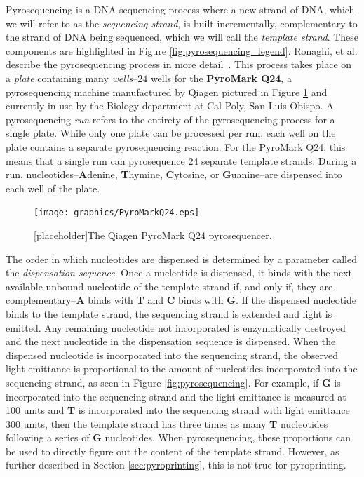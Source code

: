 \documentclass[12pt]{ucthesis}
\begin{document}
      Pyrosequencing is a DNA sequencing process where a new strand of DNA,
      which we will refer to as the \textit{sequencing strand}, is built
      incrementally, complementary to the strand of DNA being sequenced, which
      we will call the \textit{template strand}. These components are
      highlighted in Figure \ref{fig:pyrosequencing_legend}. Ronaghi, et al.
      describe the pyrosequencing process in more
      detail~\cite{ronaghi:shedsLight}. This process takes place on a
      \textit{plate} containing many \textit{wells}--$24$ wells for the
      \textbf{PyroMark Q24}, a pyrosequencing machine manufactured by Qiagen
      pictured in Figure \ref{fig:pyromark} and currently in use by the Biology
      department at Cal Poly, San Luis Obispo. A pyrosequencing \textit{run}
      refers to the entirety of the pyrosequencing process for a single plate.
      While only one plate can be processed per run, each well on the plate
      contains a separate pyrosequencing reaction. For the PyroMark Q24, this
      means that a single run can pyrosequence 24 separate template strands.
      During a run, nucleotides--\textbf{A}denine, \textbf{T}hymine,
      \textbf{C}ytosine, or \textbf{G}uanine--are dispensed into each well of
      the plate.

      \begin{figure}[t]
         \centering
         \texttt{[image: graphics/PyroMarkQ24.eps]}
         \caption{[placeholder]The Qiagen PyroMark Q24 pyrosequencer.}
         \label{fig:pyromark}
      \end{figure}

      The order in which nucleotides are dispensed is determined by
      a parameter called the \textit{dispensation sequence}. Once a nucleotide is
      dispensed, it binds with the next available unbound nucleotide of the
      template strand if, and only if, they are complementary--\textbf{A} binds
      with \textbf{T} and \textbf{C} binds with \textbf{G}. If the dispensed
      nucleotide binds to the template strand, the sequencing strand is
      extended and light is emitted. Any remaining nucleotide not incorporated
      is enzymatically destroyed and the next nucleotide in the dispensation
      sequence is dispensed. When the dispensed nucleotide is incorporated into
      the sequencing strand, the observed light emittance is proportional to
      the amount of nucleotides incorporated into the sequencing strand, as
      seen in Figure \ref{fig:pyrosequencing}. For example, if \textbf{G} is
      incorporated into the sequencing strand and the light emittance is
      measured at 100 units and \textbf{T} is incorporated into the sequencing
      strand with light emittance 300 units, then the template strand has three
      times as many \textbf{T} nucleotides following a series of \textbf{G}
      nucleotides. When pyrosequencing, these proportions can be used to
      directly figure out the content of the template strand. However, as
      further described in Section \ref{sec:pyroprinting}, this is not true for
      pyroprinting.
\end{document}
